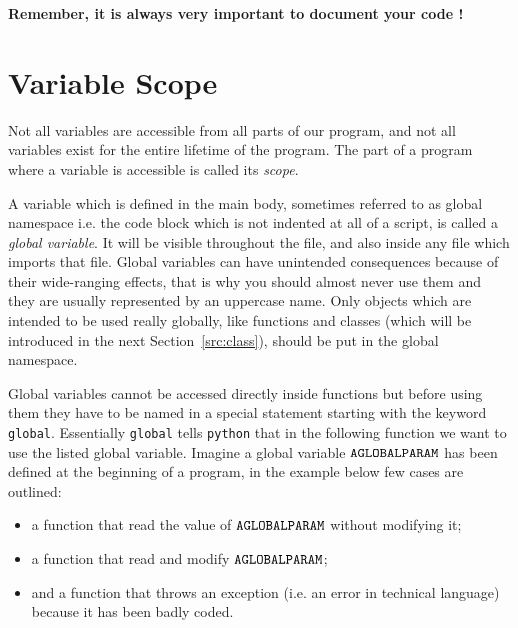 \textbf{Remember, it is always very important to document your code !}

\section{Variable Scope}
\label{sec:var_scope}

Not all variables are accessible from all parts of our program, and not all variables 
exist for the entire lifetime of the program. The part of a program where a variable 
is accessible is called its \emph{scope}.

A variable which is defined in the main body, sometimes referred to as global namespace 
i.e. the code block which is not indented at all of a script, is called a \emph{global variable}. 
It will be visible throughout the file, and also inside any file which imports that file. 
Global variables can have unintended consequences because of their wide-ranging effects, 
that is why you should almost never use them and they are usually represented by an uppercase name. 
Only objects which are intended to be used really globally, like functions and classes 
(which will be introduced in the next Section~\ref{src:class}), should be put in the global namespace.

Global variables cannot be accessed directly inside functions but before using them they 
have to be named in a special statement starting with the keyword \texttt{global}. 
Essentially \texttt{global} tells \texttt{python} that in the following function we want to 
use the listed global variable.
Imagine a global variable $\tt{AGLOBALPARAM}$ has been defined at the beginning of a program, 
in the example below few cases are outlined:
\begin {itemize}
\tightlist
\item a function that read the value of $\tt{AGLOBALPARAM}$ without modifying it;
\item a function that read and modify $\tt{AGLOBALPARAM}$;
\item and a function that throws an exception (i.e. an error in technical language) because it has been badly coded.
\end{itemize}

